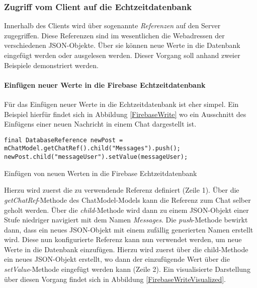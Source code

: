 \documentclass[../main.tex]{subfiles}
\begin{document}
	\subsubsection{Zugriff vom Client auf die Echtzeitdatenbank}
	Innerhalb des Clients wird über sogenannte \emph{Referenzen} auf den Server zugegriffen. Diese Referenzen sind im wesentlichen die Webadressen der verschiedenen JSON-Objekte. Über sie können neue Werte in die Datenbank eingefügt werden oder ausgelesen werden. Dieser Vorgang soll anhand zweier Beispiele demonstriert werden.
	
	\paragraph{Einfügen neuer Werte in die Firebase Echtzeitdatenbank}
	Für das Einfügen neuer Werte in die Echtzeitdatenbank ist eher simpel. Ein Beispiel hierfür findet sich in Abbildung \ref{FirebaseWrite} wo ein Ausschnitt des Einfügens einer neuen Nachricht in einem Chat dargestellt ist.

\begin{code}
	\begin{center}
		\begin{verbatim}
final DatabaseReference newPost = mChatModel.getChatRef().child("Messages").push();
newPost.child("messageUser").setValue(messageUser);
		\end{verbatim}
		\caption{Einfügen von neuen Werten in die Firebase Echtzeitdatenbank}
		\label{FirebaseWrite}
	\end{center}
\end{code}
	
	Hierzu wird zuerst die zu verwendende Referenz definiert (Zeile 1). Über die \emph{getChatRef}-Methode des ChatModel-Models kann die Referenz zum Chat selber geholt werden. Über die \emph{child}-Methode wird dann zu einem JSON-Objekt einer Stufe niedriger navigiert mit dem Namen \emph{Messages}. Die \emph{push}-Methode bewirkt dann, dass ein neues JSON-Objekt mit einem zufällig generierten Namen erstellt wird. Diese nun konfigurierte Referenz kann nun verwendet werden, um neue Werte in die Datenbank einzufügen. Hierzu wird zuerst über die child-Methode ein neues JSON-Objekt erstellt, wo dann der einzufügende Wert über die \emph{setValue}-Methode eingefügt werden kann (Zeile 2). Ein visualisierte Darstellung über diesen Vorgang findet sich in Abbildung \ref{FirebaseWriteVisualized}.
	
\end{document}
